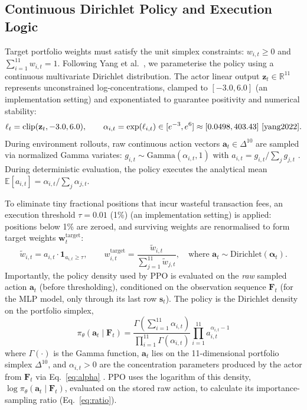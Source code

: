 \documentclass[11pt,a4paper]{article}
\numberwithin{equation}{section}
\numberwithin{table}{section}
\numberwithin{figure}{section}
\numberwithin{algorithm}{section}
\newcommand{\F}{\mathbf{F}}
\newcommand{\bs}{\mathbf{s}}
\newcommand{\ba}{\mathbf{a}}
\newcommand{\bw}{\mathbf{w}}
\newcommand{\balpha}{\bm{\alpha}}
\begin{document}
\subsection{Continuous Dirichlet Policy and Execution Logic}\label{sec:dirichlet}
Target portfolio weights must satisfy the unit simplex constraints: $w_{i,t}\ge0$ and $\sum_{i=1}^{11}w_{i,t}=1$. Following Yang et al.\ \cite{yang2022}, we parameterise the policy using a continuous multivariate Dirichlet distribution. The actor linear output $\mathbf{z}_t\in\mathbb{R}^{11}$ represents unconstrained log-concentrations, clamped to $[-3.0,6.0]$ (an implementation setting) and exponentiated to guarantee positivity and numerical stability:
\begin{equation}
\ell_t=\mathrm{clip}(\mathbf{z}_t,-3.0,6.0),\qquad \alpha_{i,t}=\exp(\ell_{i,t})\in[e^{-3},e^{6}]\approx[0.0498,403.43]\ \cite{yang2022}.\label{eq:alpha}
\end{equation}
During environment rollouts, raw continuous action vectors $\ba_t\in\Delta^{10}$ are sampled via normalized Gamma variates: $g_{i,t}\sim\mathrm{Gamma}(\alpha_{i,t},1)$ with $a_{i,t}=g_{i,t}/\sum_j g_{j,t}$ \cite{yang2022}. During deterministic evaluation, the policy executes the analytical mean $\mathbb{E}[a_{i,t}]=\alpha_{i,t}/\sum_j\alpha_{j,t}$.

To eliminate tiny fractional positions that incur wasteful transaction fees, an execution threshold $\tau=0.01$ (1\%) (an implementation setting) is applied: positions below 1\% are zeroed, and surviving weights are renormalised to form target weights $\bw_t^{\mathrm{target}}$:
\begin{equation}
\tilde w_{i,t}=a_{i,t}\cdot\mathbf{1}_{a_{i,t}\ge\tau},\qquad w_{i,t}^{\mathrm{target}}=\frac{\tilde w_{i,t}}{\sum_{j=1}^{11}\tilde w_{j,t}},\quad\text{where }\ba_t\sim\mathrm{Dirichlet}(\balpha_t).\label{eq:thresh}
\end{equation}
Importantly, the policy density used by PPO is evaluated on the \emph{raw} sampled action $\ba_t$ (before thresholding), conditioned on the observation sequence $\F_t$ (for the MLP model, only through its last row $\bs_t$). The policy is the Dirichlet density on the portfolio simplex,
\begin{equation}
\boxed{\;\pi_\theta(\ba_t\mid\F_t)=\frac{\Gamma\!\left(\sum_{i=1}^{11}\alpha_{i,t}\right)}{\prod_{i=1}^{11}\Gamma(\alpha_{i,t})}\prod_{i=1}^{11}a_{i,t}^{\alpha_{i,t}-1}\;}\label{eq:dirichlet}
\end{equation}
where $\Gamma(\cdot)$ is the Gamma function, $\ba_t$ lies on the 11-dimensional portfolio simplex $\Delta^{10}$, and $\alpha_{i,t}>0$ are the concentration parameters produced by the actor from $\F_t$ via Eq.~\eqref{eq:alpha} \cite{yang2022}. PPO uses the logarithm of this density, $\log\pi_\theta(\ba_t\mid\F_t)$, evaluated on the stored raw action, to calculate its importance-sampling ratio (Eq.~\eqref{eq:ratio}).
\end{document}
